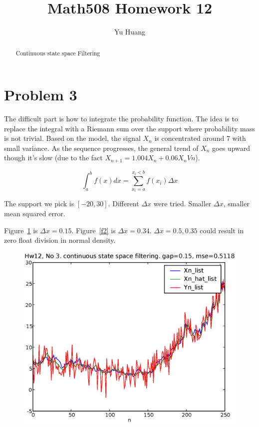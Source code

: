 \documentclass[a4paper,10pt]{article}
\title{Math508 Homework 12}
\author{Yu Huang}
\begin{document}
\maketitle

\begin{abstract}
Continuous state space Filtering
\end{abstract}

\section{Problem 3}
The difficult part is how to integrate the probability function. The idea is to replace the integral with a Riemann sum over the support where probability mass is not trivial. Based on the model, the signal $X_n$ is concentrated around 7 with small variance. As the sequence progresses, the general trend of $X_n$ goes upward though it's slow (due to the fact $X_{n+1} = 1.004X_n + 0.06X_nVn$).

\begin{equation}
\int_a^b f(x) dx = \sum_{x_i=a}^{x_i<b} f(x_i) \Delta x
\end{equation}


The support we pick is $[-20, 30]$. Different $\Delta x$ were tried. Smaller $\Delta x$, smaller mean squared error.


Figure~\ref{f1} is $\Delta x=0.15$. Figure~\ref{f2} is $\Delta x=0.34$. $\Delta x=0.5, 0.35$ could result in zero float division in normal density.

\begin{figure}
\includegraphics[width=1\textwidth]{hw12_3_gap_0_15.eps}
\caption{}\label{f1}
\end{figure}
\end{document}
